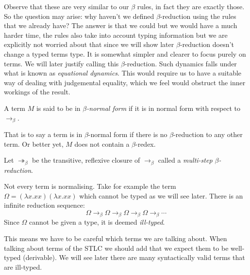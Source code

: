 \begin{remark}
    Observe that these are very similar to our $\beta$ rules, in fact they are exactly those. So the question may arise: why haven't we defined $\beta$-reduction using the rules that we already have? The answer is that we could but we would have a much harder time, the rules also take into account typing information but we are explicitly not worried about that since we will show later $\beta$-reduction doesn't change a typed terms type. It is somewhat simpler and clearer to focus purely on terms. We will later justify calling this $\beta$-reduction.
    Such dynamics falls under what is known as \emph{equational dynamics}. This would require us to have a suitable way of dealing with judgemental equality, which we feel would obstruct the inner workings of the result.
\end{remark}

\begin{defin}\label{normal_form}
    A term $M$ is said to be in \emph{$\beta$-normal form} if it is in normal form with respect to $\to_\beta$.
\end{defin}

\begin{remark}
    That is to say a term is in $\beta$-normal form if there is no $\beta$-reduction to any other term. Or better yet, $M$ does not contain a $\beta$-redex.
\end{remark}

\begin{defin}
    Let $\twoheadrightarrow_{\beta}$ be the transitive, reflexive closure of $\to_{\beta}$ called a \emph{multi-step $\beta$-reduction}.
\end{defin}

\begin{remark}\label{beta_non_normalising_remark}
    Not every term is normalising. Take for example the term $\Omega=(\lambda x . x x)(\lambda x . x x)$ which cannot be typed as we will see later. There is an infinite reduction sequence:
    $$
        \Omega \to_{\beta} \Omega \to_{\beta} \Omega \to_{\beta} \Omega \to_{\beta} \cdots
    $$
    Since $\Omega$ cannot be given a type, it is deemed \emph{ill-typed}.
\end{remark}

This means we have to be careful which terms we are talking about. When talking about terms of the STLC we should add that we expect them to be well-typed (derivable). We will see later there are many syntactically valid terms that are ill-typed.

